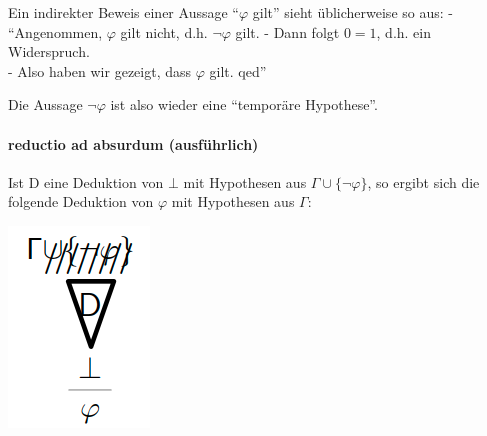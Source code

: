 \documentclass[a4paper]{article}
\begin{document}
\begin{multicols}{3}
  Ein indirekter Beweis einer Aussage ``$\varphi$ gilt'' sieht
  üblicherweise so aus: - ``Angenommen, $\varphi$ gilt nicht, d.h.
  $\lnot\varphi$ gilt. - Dann folgt $0=1$, d.h. ein Widerspruch.\\- Also
  haben wir gezeigt, dass $\varphi$ gilt. qed''

  Die Aussage $\lnot\varphi$ ist also wieder eine ``temporäre Hypothese''.

  \paragraph{reductio ad absurdum
    (ausführlich)}\label{reductio-ad-absurdum-ausfuxfchrlich}

  Ist D eine Deduktion von $\bot$ mit Hypothesen aus
  $\Gamma\cup\{\lnot\varphi\}$, so ergibt sich die folgende Deduktion von
  $\varphi$ mit Hypothesen aus $\Gamma$:


  \includegraphics[width=\linewidth]{Assets/Logik-reductio-ad-absurdum.png}


\end{multicols}
\end{document}

